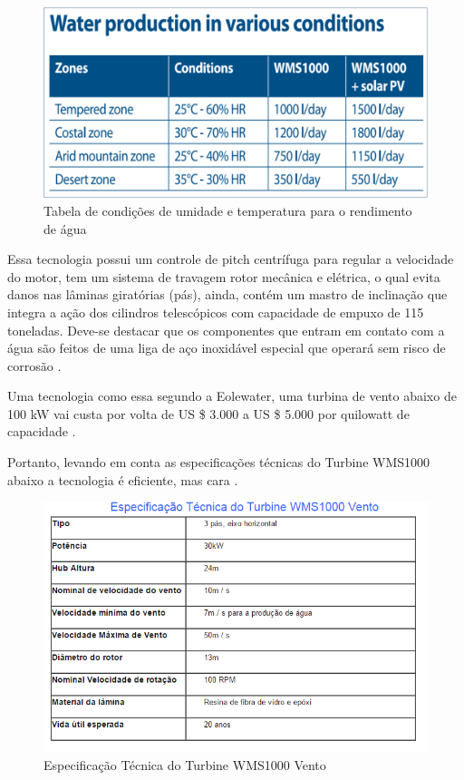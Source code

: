 \begin{figure}[!htbp]
\centering
\includegraphics[scale=0.3]{editaveis/figuras/condicoes}
\caption[Tabela de condições de umidade e temperatura para o rendimento de água]{Tabela de condições de umidade e temperatura para o rendimento de água \footnotemark}
\FloatBarrier
\label{condicoes}
\end{figure}

Essa tecnologia possui um controle de pitch centrífuga para regular a velocidade do motor, tem um sistema de travagem
rotor mecânica e elétrica, o qual evita danos nas lâminas giratórias (pás), ainda, contém um mastro de inclinação que 
integra a ação dos cilindros telescópicos com capacidade de empuxo de 115 toneladas. Deve-se destacar que os componentes 
que entram em contato com a água são feitos de uma liga de aço inoxidável especial que operará sem risco de corrosão 
\cite{eole}.

Uma tecnologia como essa segundo a Eolewater, uma turbina de vento abaixo de 100 kW vai custa por volta de
 US \$ 3.000 a US \$ 5.000 por quilowatt de capacidade \cite{eole}.

Portanto, levando em conta as especificações técnicas do Turbine WMS1000 abaixo a tecnologia é eficiente, mas cara \cite{renewable}.
	
\begin{figure}[!htbp]
\centering
\includegraphics[scale=0.8]{editaveis/figuras/especificacao}
\caption[Especificação Técnica do Turbine WMS1000]{Especificação Técnica do Turbine WMS1000 Vento \footnotemark}
\FloatBarrier
\label{Especificacoes}
\end{figure}
 
